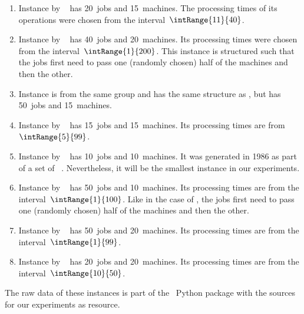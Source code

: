 \begin{enumerate}%
%
\item Instance  by \citeauthor{ABZ1988TSBPFJSS}~\cite{ABZ1988TSBPFJSS} has 20~jobs and 15~machines.
The processing times of its operations were chosen from the interval~$\intRange{11}{40}$.%
%
\item Instance  by \citeauthor{DMU1998BFSSP}~\cite{DMU1998BFSSP} has 40~jobs and 20~machines.
Its processing times were chosen from the interval~$\intRange{1}{200}$.
This instance is structured such that the jobs first need to pass one (randomly chosen) half of the machines and then the other.%
%
\item Instance  is from the same group and has the same structure as , but has 50~jobs and 15~machines.%
%
\item Instance  by \citeauthor{L1998RCPSAEIOHSTS}~\cite{L1998RCPSAEIOHSTS} has 15~jobs and 15~machines.
Its processing times are from~$\intRange{5}{99}$.%
%
\item Instance  by \citeauthor{AC1991ACSOTJSSP}~\cite{AC1991ACSOTJSSP} has 10~jobs and 10~machines.
It was generated in 1986 as part of a set of ~\cite{JM1999DJSSPPAF,H2002PJSSP}.
Nevertheless, it will be the smallest instance in our experiments.%
%
\item Instance  by \citeauthor{SWV1992NSSFSPWATJSS}~\cite{SWV1992NSSFSPWATJSS} has 50~jobs and 10~machines.
Its processing times are from the interval~$\intRange{1}{100}$.
Like in the case of , the jobs first need to pass one (randomly chosen) half of the machines and then the other.%
%
\item Instance  by \citeauthor{T1993BFBSP}~\cite{T1993BFBSP} has 50~jobs and 20~machines.
Its processing times are from the interval~$\intRange{1}{99}$.%
%
\item Instance  by \citeauthor{YN1992AGAATLSJSI}~\cite{YN1992AGAATLSJSI} has 20~jobs and 20~machines.
Its processing times are from the interval~$\intRange{10}{50}$.%
%
\end{enumerate}%
%
The raw data of these instances is part of the \moptipy\ Python package with the sources for our experiments as resource.

